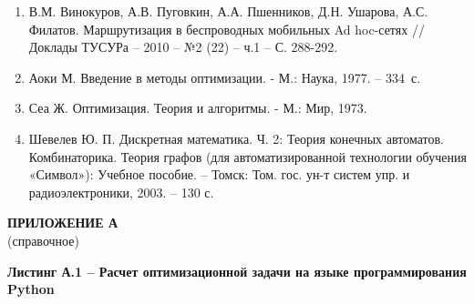 \documentclass[14pt,a4paper,titlepage]{extarticle}
\begin{document}
\begin{enumerate}
\item В.М. Винокуров, А.В. Пуговкин, А.А. Пшенников, Д.Н. Ушарова, А.С. Филатов. Маршрутизация в беспроводных мобильных Ad hoc-сетях // Доклады ТУСУРа -- 2010  --  №2 (22)  --  ч.1  -- С. 288-292.
\item Аоки М. Введение в методы оптимизации. - М.: Наука, 1977. -- 334~с.
\item Сеа Ж. Оптимизация. Теория и алгоритмы. - М.: Мир, 1973.
\item Шевелев Ю. П. Дискретная математика. Ч. 2: Теория конечных автоматов. Комбинаторика. Теория графов (для автоматизированной технологии обучения «Символ»): Учебное пособие. -- Томск: Том. гос. ун-т систем упр. и радиоэлектроники, 2003. -- 130 с.
\end{enumerate}

\clearpage
\begin{center}
\textbf{ПРИЛОЖЕНИЕ А} \\
(справочное)
\end{center}
\par {}
\begin{minipage}{\textwidth-\parindent}
\textbf{Листинг А.1 -- Расчет оптимизационной задачи на языке программирования Python}%
\end{minipage}
\inputminted[breaklines,linenos,fontsize=\small]{python}{single_solution.py}
\end{document}
